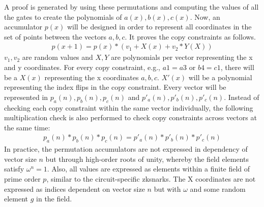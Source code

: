 A proof is generated by using these permutations and computing the values of all the gates to create the polynomials of \(a(x), b(x), c(x)\). Now, an accumulator \(p(x)\) will be designed in order to represent all coordinates in the set of points between the vectors \(a, b, c\). It proves the copy constraints as follows.
\begin{align}
    p(x+1) = p(x) * (v_1 + X(x) + v_2 * Y(X))
\end{align}
\(v_1, v_2\) are random values and \(X, Y\) are polynomials per vector representing the x and y coordinates. For every copy constraint, e.g., \(a1=a3\) or \(b4=c1\), there will be a \(X(x)\) representing the x coordinates \(a,b, c\). \(X'(x)\) will be a polynomial representing the index flips in the copy constraint. Every vector will be represented in \(p_{a}(n), p_{b}(n), p_{c}(n)\) and \(p'_{a}(n), p'_{b}(n), p'_{c}(n)\). Instead of checking each copy constraint within the same vector individually, the following multiplication check is also performed to check copy constraints across vectors at the same time:
\begin{align}
    p_{a}(n) * p_{b}(n) * p_{c}(n) = p'_{a}(n) * p'_{b}(n) * p'_{c}(n)
\end{align}
In practice, the permutation accumulators are not expressed in dependency of vector size \(n\) but through high-order roots of unity, whereby the field elements satisfy \(\omega^n = 1\). Also, all values are expressed as elements within a finite field of prime order \(p\), similar to the circuit-specific \acrshort{zksnark}s. The X coordinates are not expressed as indices dependent on vector size \(n\) but with \(\omega\) and some random element \(g\) in the field.
